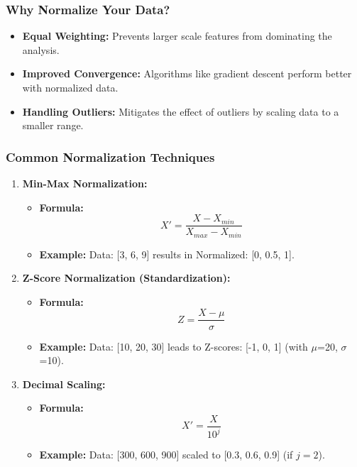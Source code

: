 \documentclass[aspectratio=169]{beamer}
\begin{document}
\begin{frame}[fragile]
    \frametitle{Why Normalize Your Data?}
    \begin{itemize}
        \item \textbf{Equal Weighting:} Prevents larger scale features from dominating the analysis.
        \item \textbf{Improved Convergence:} Algorithms like gradient descent perform better with normalized data.
        \item \textbf{Handling Outliers:} Mitigates the effect of outliers by scaling data to a smaller range.
    \end{itemize}
\end{frame}

\begin{frame}[fragile]
    \frametitle{Common Normalization Techniques}
    \begin{enumerate}
        \item \textbf{Min-Max Normalization:}
        \begin{itemize}
            \item \textbf{Formula:} 
            \[
            X' = \frac{X - X_{min}}{X_{max} - X_{min}}
            \]
            \item \textbf{Example:} 
            Data: [3, 6, 9] results in Normalized: [0, 0.5, 1].
        \end{itemize}

        \item \textbf{Z-Score Normalization (Standardization):}
        \begin{itemize}
            \item \textbf{Formula:}
            \[
            Z = \frac{X - \mu}{\sigma}
            \]
            \item \textbf{Example:} 
            Data: [10, 20, 30] leads to Z-scores: [-1, 0, 1] (with $\mu$=20, $\sigma$=10).
        \end{itemize}

        \item \textbf{Decimal Scaling:}
        \begin{itemize}
            \item \textbf{Formula:}
            \[
            X' = \frac{X}{10^j}
            \]
            \item \textbf{Example:} 
            Data: [300, 600, 900] scaled to [0.3, 0.6, 0.9] (if $j=2$).
        \end{itemize}
    \end{enumerate}
\end{frame}
\end{document}
